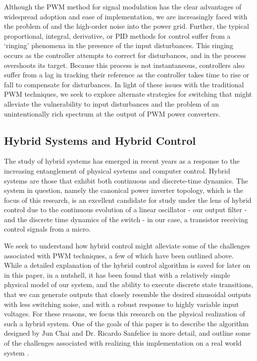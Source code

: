 Although the PWM method for signal modulation has the clear advantages of widespread adoption and ease of implementation, we are increasingly faced with the problem of and the high-order noise into the power grid. Further, the typical proportional, integral, derivative, or PID methods for control suffer from a `ringing' phenomena in the presence of the input disturbances. This ringing occurs as the controller attempts to correct for disturbances, and in the process overshoots its target. Because this process is not instantaneous, controllers also suffer from a lag in tracking their reference as the controller takes time to rise or fall to compensate for disturbances. In light of these issues with the traditional PWM techniques, we seek to explore alternate strategies for switching that might alleviate the vulnerability to input disturbances and the problem of an unintentionally rich spectrum at the output of PWM power converters. 

\subsection{Hybrid Systems and Hybrid Control}
\label{hybridApproach}
The study of hybrid systems has emerged in recent years as a response to the increasing entanglement of physical systems and computer control. 
Hybrid systems are those that exhibit both continuous and discrete-time dynamics. The system in question, namely the canonical power inverter topology, which is the focus of this research, is an excellent candidate for study under the lens of hybrid control due to the continuous evolution of a linear oscillator - our output filter - and the discrete time dynamics of the switch - in our case, a transistor receiving control signals from a micro. 

We seek to understand how hybrid control might alleviate some of the challenges associated with PWM techniques, a few of which have been outlined above. While a detailed explanation of the hybrid control algorithm is saved for later on in this paper, in a nutshell, it has been found that with a relatively simple physical model of our system, and the ability to execute discrete state transitions, that we can generate outputs that closely resemble the desired sinusoidal outputs with less switching noise, and with a robust response to highly variable input voltages. For these reasons, we focus this research on the physical realization of such a hybrid system. One of the goals of this paper is to describe the algorithm designed by Jun Chai and Dr. Ricardo Sanfelice in more detail, and outline some of the challenges associated with realizing this implementation on a real world system \cite{ricardo}.

